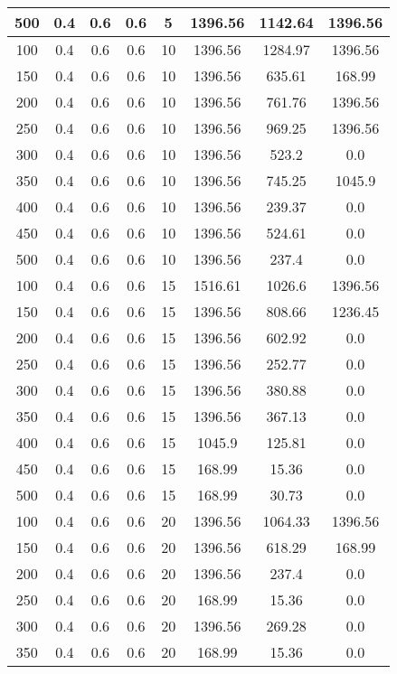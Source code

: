 \documentclass[a4paper, 12pt]{extreport}
\begin{document}
\begin{itemize}
\begin{longtable}{|c|c|c|c|c|c|c|c|}
			500 & 0.4 & 0.6 & 0.6 & 5 & 1396.56 & 1142.64 & 1396.56 \\\hline
			100 & 0.4 & 0.6 & 0.6 & 10 & 1396.56 & 1284.97 & 1396.56 \\\hline
			150 & 0.4 & 0.6 & 0.6 & 10 & 1396.56 & 635.61 & 168.99 \\\hline
			200 & 0.4 & 0.6 & 0.6 & 10 & 1396.56 & 761.76 & 1396.56 \\\hline
			250 & 0.4 & 0.6 & 0.6 & 10 & 1396.56 & 969.25 & 1396.56 \\\hline
			300 & 0.4 & 0.6 & 0.6 & 10 & 1396.56 & 523.2 & 0.0 \\\hline
			350 & 0.4 & 0.6 & 0.6 & 10 & 1396.56 & 745.25 & 1045.9 \\\hline
			400 & 0.4 & 0.6 & 0.6 & 10 & 1396.56 & 239.37 & 0.0 \\\hline
			450 & 0.4 & 0.6 & 0.6 & 10 & 1396.56 & 524.61 & 0.0 \\\hline
			500 & 0.4 & 0.6 & 0.6 & 10 & 1396.56 & 237.4 & 0.0 \\\hline
			100 & 0.4 & 0.6 & 0.6 & 15 & 1516.61 & 1026.6 & 1396.56 \\\hline
			150 & 0.4 & 0.6 & 0.6 & 15 & 1396.56 & 808.66 & 1236.45 \\\hline
			200 & 0.4 & 0.6 & 0.6 & 15 & 1396.56 & 602.92 & 0.0 \\\hline
			250 & 0.4 & 0.6 & 0.6 & 15 & 1396.56 & 252.77 & 0.0 \\\hline
			300 & 0.4 & 0.6 & 0.6 & 15 & 1396.56 & 380.88 & 0.0 \\\hline
			350 & 0.4 & 0.6 & 0.6 & 15 & 1396.56 & 367.13 & 0.0 \\\hline
			400 & 0.4 & 0.6 & 0.6 & 15 & 1045.9 & 125.81 & 0.0 \\\hline
			450 & 0.4 & 0.6 & 0.6 & 15 & 168.99 & 15.36 & 0.0 \\\hline
			500 & 0.4 & 0.6 & 0.6 & 15 & 168.99 & 30.73 & 0.0 \\\hline
			100 & 0.4 & 0.6 & 0.6 & 20 & 1396.56 & 1064.33 & 1396.56 \\\hline
			150 & 0.4 & 0.6 & 0.6 & 20 & 1396.56 & 618.29 & 168.99 \\\hline
			200 & 0.4 & 0.6 & 0.6 & 20 & 1396.56 & 237.4 & 0.0 \\\hline
			250 & 0.4 & 0.6 & 0.6 & 20 & 168.99 & 15.36 & 0.0 \\\hline
			300 & 0.4 & 0.6 & 0.6 & 20 & 1396.56 & 269.28 & 0.0 \\\hline
			350 & 0.4 & 0.6 & 0.6 & 20 & 168.99 & 15.36 & 0.0 \\\hline

\end{longtable}
\end{itemize}
\end{document}
